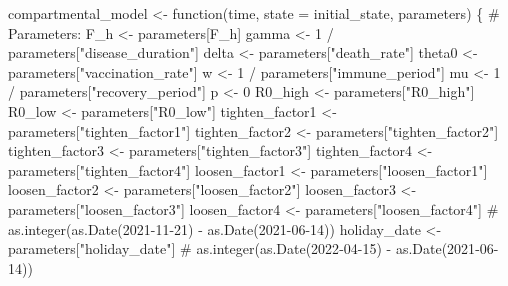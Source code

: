 \documentclass[
  11pt,
  letterpaper,
  DIV=11,
  numbers=noendperiod]{scrartcl}
\newenvironment{Shaded}{\begin{snugshade}}{\end{snugshade}}
\newcommand{\AttributeTok}[1]{\textcolor[rgb]{0.40,0.45,0.13}{#1}}
\newcommand{\CommentTok}[1]{\textcolor[rgb]{0.37,0.37,0.37}{#1}}
\newcommand{\ControlFlowTok}[1]{\textcolor[rgb]{0.00,0.23,0.31}{#1}}
\newcommand{\DecValTok}[1]{\textcolor[rgb]{0.68,0.00,0.00}{#1}}
\newcommand{\NormalTok}[1]{\textcolor[rgb]{0.00,0.23,0.31}{#1}}
\newcommand{\OtherTok}[1]{\textcolor[rgb]{0.00,0.23,0.31}{#1}}
\newcommand{\SpecialCharTok}[1]{\textcolor[rgb]{0.37,0.37,0.37}{#1}}
\newcommand{\StringTok}[1]{\textcolor[rgb]{0.13,0.47,0.30}{#1}}
\begin{document}
\begin{Shaded}
\begin{Highlighting}[]
\NormalTok{compartmental\_model }\OtherTok{\textless{}{-}} \ControlFlowTok{function}\NormalTok{(time, }\AttributeTok{state =}\NormalTok{ initial\_state, parameters) \{}
    \CommentTok{\# Parameters:}
\NormalTok{    F\_h     }\OtherTok{\textless{}{-}}\NormalTok{ parameters[}\StringTok{\textquotesingle{}F\_h\textquotesingle{}}\NormalTok{]}
\NormalTok{    gamma   }\OtherTok{\textless{}{-}} \DecValTok{1} \SpecialCharTok{/}\NormalTok{ parameters[}\StringTok{"disease\_duration"}\NormalTok{]}
\NormalTok{    delta   }\OtherTok{\textless{}{-}}\NormalTok{ parameters[}\StringTok{"death\_rate"}\NormalTok{]}
\NormalTok{    theta0  }\OtherTok{\textless{}{-}}\NormalTok{ parameters[}\StringTok{"vaccination\_rate"}\NormalTok{]}
\NormalTok{    w       }\OtherTok{\textless{}{-}} \DecValTok{1} \SpecialCharTok{/}\NormalTok{ parameters[}\StringTok{"immune\_period"}\NormalTok{]}
\NormalTok{    mu      }\OtherTok{\textless{}{-}} \DecValTok{1} \SpecialCharTok{/}\NormalTok{ parameters[}\StringTok{"recovery\_period"}\NormalTok{]}
\NormalTok{    p       }\OtherTok{\textless{}{-}} \DecValTok{0}
\NormalTok{    R0\_high }\OtherTok{\textless{}{-}}\NormalTok{ parameters[}\StringTok{"R0\_high"}\NormalTok{]}
\NormalTok{    R0\_low  }\OtherTok{\textless{}{-}}\NormalTok{ parameters[}\StringTok{"R0\_low"}\NormalTok{]}
\NormalTok{    tighten\_factor1   }\OtherTok{\textless{}{-}}\NormalTok{ parameters[}\StringTok{"tighten\_factor1"}\NormalTok{]}
\NormalTok{    tighten\_factor2   }\OtherTok{\textless{}{-}}\NormalTok{ parameters[}\StringTok{"tighten\_factor2"}\NormalTok{]}
\NormalTok{    tighten\_factor3   }\OtherTok{\textless{}{-}}\NormalTok{ parameters[}\StringTok{"tighten\_factor3"}\NormalTok{]}
\NormalTok{    tighten\_factor4   }\OtherTok{\textless{}{-}}\NormalTok{ parameters[}\StringTok{"tighten\_factor4"}\NormalTok{]}
\NormalTok{    loosen\_factor1   }\OtherTok{\textless{}{-}}\NormalTok{ parameters[}\StringTok{"loosen\_factor1"}\NormalTok{]}
\NormalTok{    loosen\_factor2   }\OtherTok{\textless{}{-}}\NormalTok{ parameters[}\StringTok{"loosen\_factor2"}\NormalTok{]}
\NormalTok{    loosen\_factor3   }\OtherTok{\textless{}{-}}\NormalTok{ parameters[}\StringTok{"loosen\_factor3"}\NormalTok{]}
\NormalTok{    loosen\_factor4   }\OtherTok{\textless{}{-}}\NormalTok{ parameters[}\StringTok{"loosen\_factor4"}\NormalTok{]}
    \CommentTok{\# as.integer(as.Date(\textquotesingle{}2021{-}11{-}21\textquotesingle{}) {-} as.Date(\textquotesingle{}2021{-}06{-}14\textquotesingle{}))}
\NormalTok{    holiday\_date     }\OtherTok{\textless{}{-}}\NormalTok{ parameters[}\StringTok{"holiday\_date"}\NormalTok{]}
    \CommentTok{\# as.integer(as.Date(\textquotesingle{}2022{-}04{-}15\textquotesingle{}) {-} as.Date(\textquotesingle{}2021{-}06{-}14\textquotesingle{}))}

\end{Highlighting}
\end{Shaded}
\end{document}
